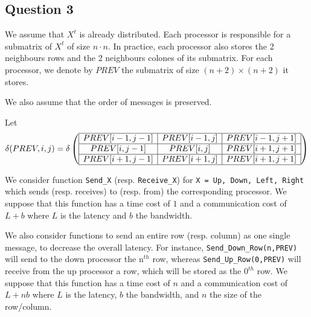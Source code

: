 
\subsection*{Question 3}

We assume that $X^t$ is already distributed. Each processor is responsible for a submatrix of $X^t$ of size $n \cdot n$. In practice, each processor also stores the 2 neighbours rows and the 2 neighbours colones of its submatrix. For each processor, we denote by $PREV$ the submatrix of size $(n+2) \times (n+2)$ it stores.

We also assume that the order of messages is preserved.

Let $$\delta(PREV,i,j) = \delta \left( \begin{array}{ | c | c | c |} \hline

  PREV[i-1,j-1] & PREV[i-1,j] & PREV[i-1,j+1] \\ \hline

  PREV[i,j-1] & PREV[i,j] & PREV[i+1,j+1] \\ \hline

  PREV[i+1,j-1] & PREV[i+1,j] & PREV[i+1,j+1] \\ \hline

 \end{array} \right)$$

We consider function \texttt{Send\_X} (resp. \texttt{Receive\_X}) for \texttt{X = Up, Down, Left, Right} which sends (resp. receives) to (resp. from) the corresponding processor. 
We suppose that this function has a time cost of $1$ and a communication cost of $L+b$ where $L$ is the latency and $b$ the bandwidth.

We also consider functions to send an entire row (resp. column) as one single message, to decrease the overall latency. For instance, \texttt{Send\_Down\_Row(n,PREV)} will send to the down processor the $\text{n}^{th}$ row, whereas \texttt{Send\_Up\_Row(0,PREV)} will receive from the up processor a row, which will be stored as the $\text{0}^{th}$ row.
We suppose that this function has a time cost of $n$ and a communication cost of $L+nb$ where $L$ is the latency, $b$ the bandwidth, and $n$ the size of the row/column.

